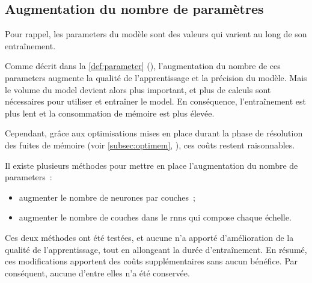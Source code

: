 \pagebreak
\subsection{Augmentation du nombre de paramètres}\label{subsec:optiparam}
Pour rappel, les \glspl{parameter} du modèle sont des valeurs qui varient au long de son entraînement.

Comme décrit dans la \autoref{def:parameter} (), %
l'augmentation du nombre de ces \glspl{parameter} augmente la qualité de l'apprentissage et la précision du modèle. Mais le volume du \gls{model} devient alors plus important, et plus de calculs sont nécessaires pour utiliser et entraîner le \gls{model}. En conséquence, l'entraînement est plus lent et la consommation de mémoire est plus élevée.

Cependant, grâce aux optimisations mises en place durant la phase de résolution des fuites de mémoire (voir \autoref{subsec:optimem}, ), ces coûts restent raisonnables.

Il existe plusieurs méthodes pour mettre en place l'augmentation du nombre de \glspl{parameter}~:
\begin{itemize}
	\item augmenter le nombre de neurones par couches~;
	\item augmenter le nombre de couches dans le \glspl{rnn} qui compose chaque \og échelle\fg{}.
\end{itemize}
\vspace{1em}

Ces deux méthodes ont été testées, et aucune n'a apporté d'amélioration de la qualité de l'apprentissage, tout en allongeant la durée d'entraînement.
En résumé, ces modifications apportent des coûts supplémentaires sans aucun bénéfice. Par conséquent, aucune d'entre elles n'a été conservée.
